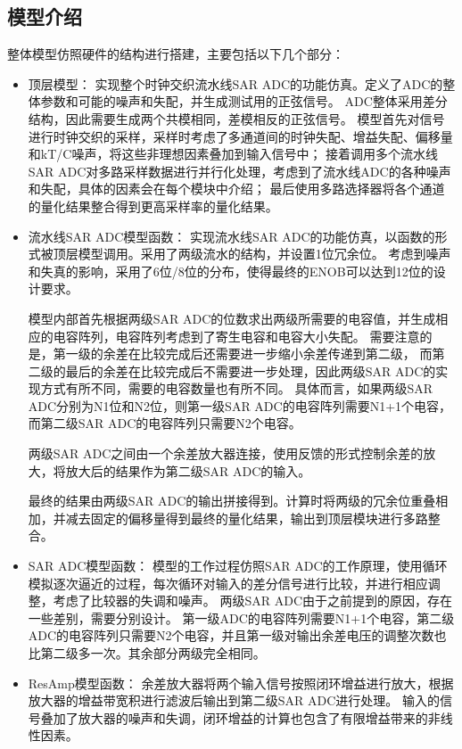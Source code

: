 \documentclass[cs4size,a4paper]{ctexart}
\numberwithin{equation}{section}
\numberwithin{table}{section}
\numberwithin{figure}{section}
\begin{document}
	\subsection{模型介绍}
	整体模型仿照硬件的结构进行搭建，主要包括以下几个部分：
	\begin{itemize}
		\item 顶层模型：
		实现整个时钟交织流水线SAR ADC的功能仿真。定义了ADC的整体参数和可能的噪声和失配，并生成测试用的正弦信号。
		ADC整体采用差分结构，因此需要生成两个共模相同，差模相反的正弦信号。
		模型首先对信号进行时钟交织的采样，采样时考虑了多通道间的时钟失配、增益失配、偏移量和kT/C噪声，将这些非理想因素叠加到输入信号中；
		接着调用多个流水线SAR ADC对多路采样数据进行并行化处理，考虑到了流水线ADC的各种噪声和失配，具体的因素会在每个模块中介绍；
		最后使用多路选择器将各个通道的量化结果整合得到更高采样率的量化结果。
		
		\item 流水线SAR ADC模型函数：
		实现流水线SAR ADC的功能仿真，以函数的形式被顶层模型调用。采用了两级流水的结构，并设置1位冗余位。
		考虑到噪声和失真的影响，采用了6位/8位的分布，使得最终的ENOB可以达到12位的设计要求。

		模型内部首先根据两级SAR ADC的位数求出两级所需要的电容值，并生成相应的电容阵列，电容阵列考虑到了寄生电容和电容大小失配。
		需要注意的是，第一级的余差在比较完成后还需要进一步缩小余差传递到第二级，
		而第二级的最后的余差在比较完成后不需要进一步处理，因此两级SAR ADC的实现方式有所不同，需要的电容数量也有所不同。
		具体而言，如果两级SAR ADC分别为N1位和N2位，则第一级SAR ADC的电容阵列需要N1+1个电容，而第二级SAR ADC的电容阵列只需要N2个电容。
		
		两级SAR ADC之间由一个余差放大器连接，使用反馈的形式控制余差的放大，将放大后的结果作为第二级SAR ADC的输入。

		最终的结果由两级SAR ADC的输出拼接得到。计算时将两级的冗余位重叠相加，并减去固定的偏移量得到最终的量化结果，输出到顶层模块进行多路整合。

		\item SAR ADC模型函数：
		模型的工作过程仿照SAR ADC的工作原理，使用循环模拟逐次逼近的过程，每次循环对输入的差分信号进行比较，并进行相应调整，考虑了比较器的失调和噪声。
		两级SAR ADC由于之前提到的原因，存在一些差别，需要分别设计。
		第一级ADC的电容阵列需要N1+1个电容，第二级ADC的电容阵列只需要N2个电容，并且第一级对输出余差电压的调整次数也比第二级多一次。其余部分两级完全相同。

		\item ResAmp模型函数：
		余差放大器将两个输入信号按照闭环增益进行放大，根据放大器的增益带宽积进行滤波后输出到第二级SAR ADC进行处理。
		输入的信号叠加了放大器的噪声和失调，闭环增益的计算也包含了有限增益带来的非线性因素。


\end{itemize}
\end{document}
